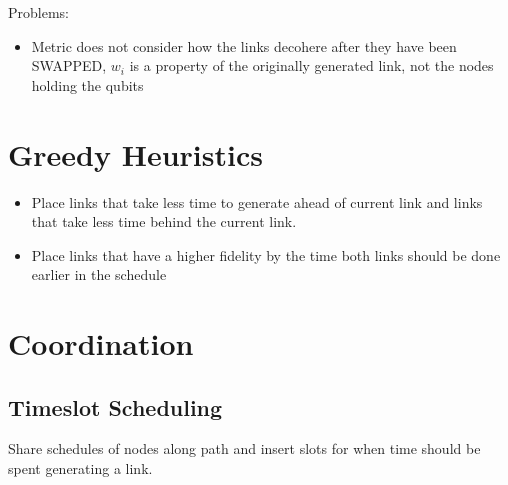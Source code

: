 \documentclass{article}
\begin{document}
Problems:
\begin{itemize}
    \item Metric does not consider how the links decohere after they have been SWAPPED, $w_i$ is a property of the
    originally generated link, not the nodes holding the qubits
\end{itemize}

\section{Greedy Heuristics}
\begin{itemize}
    \item Place links that take less time to generate ahead of current link and links that take less time behind the current link.
    \item Place links that have a higher fidelity by the time both links should be done earlier in the schedule
\end{itemize}

\section{Coordination}
\subsection{Timeslot Scheduling}
Share schedules of nodes along path and insert slots for when time should be spent generating a link.
\end{document}
